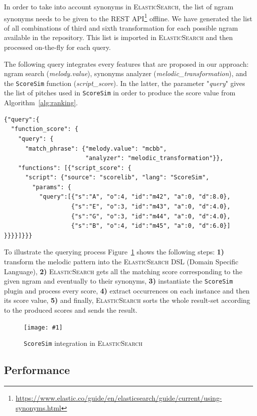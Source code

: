 \documentclass[letterpaper, 11pt]{article}
\def\elasticsearch/{\textsc{ElasticSearch}}
\newcommand{\fig}[2]
{
\begin{figure}[ht]
 \centerline{
 \texttt{[image: \#1]}}
 \caption{\label{#1} #2}
\end{figure}
}
\begin{document}
In order to take into account synonyms in \elasticsearch/, the list of ngram synonyms needs to be given to the REST API\footnote{\url{https://www.elastic.co/guide/en/elasticsearch/guide/current/using-synonyms.html}} offline. We have generated the list of all combinations of third and sixth transformation for each possible ngram available in the repository.
This list is imported in \elasticsearch/ and then processed on-the-fly for each query.

The following query integrates every features that are proposed in our approach: ngram search (\textit{melody.value}), synonyms analyzer (\textit{melodic\_transformation}), and the \texttt{ScoreSim} function (\textit{script\_score}). In the latter, the parameter "\textit{query}" gives the list of pitches used in \texttt{ScoreSim} in order to produce the score value from Algorithm~\ref{alg:ranking}.

\begin{small}
	\begin{verbatim}
{"query":{
  "function_score": {
    "query": {
      "match_phrase": {"melody.value": "mcbb",
                       "analyzer": "melodic_transformation"}},
    "functions": [{"script_score": {
      "script": {"source": "scorelib", "lang": "ScoreSim",
        "params": {
          "query":[{"s":"A", "o":4, "id":"m42", "a":0, "d":8.0},
                   {"s":"E", "o":3, "id":"m43", "a":0, "d":4.0},
                   {"s":"G", "o":3, "id":"m44", "a":0, "d":4.0},
                   {"s":"B", "o":4, "id":"m45", "a":0, "d":6.0}]
}}}}]}}} 
  \end{verbatim}
\end{small}

To illustrate the querying process Figure~\ref{../figures/Elasticsearch-implem} shows the following steps: \textbf{1)} transform the melodic pattern into the \elasticsearch/ DSL (Domain Specific Language), \textbf{2)} \elasticsearch/ gets all the matching score corresponding to the given ngram and eventually to their synonyms, \textbf{3)} instantiate the \texttt{ScoreSim} plugin and process every score, \textbf{4)} extract occurrences on each instance and then its score value, \textbf{5)} and finally, \elasticsearch/ sorts the whole result-set according to the produced scores and sends the result.

\fig{../figures/Elasticsearch-implem}{\texttt{ScoreSim} integration in \elasticsearch/}

\subsection{Performance}
\end{document}
